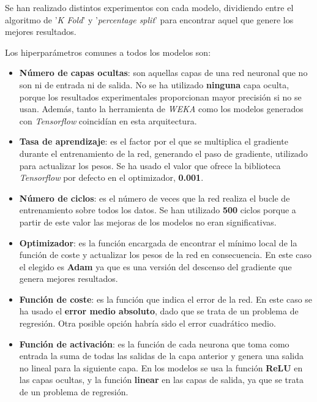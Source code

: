 \documentclass[12pt,a4paper, xcolor=table]{article}
\begin{document}
      \vspace{2mm}

      Se han realizado distintos experimentos con cada modelo, dividiendo entre el algoritmo de '\textit{K Fold}' y '\textit{percentage split}' para encontrar aquel que genere los mejores resultados.

      \vspace{3mm}

      Los hiperparámetros comunes a todos los modelos son:

      \begin{itemize}
        \item \textbf{Número de capas ocultas}: son aquellas capas de una red neuronal que no son ni de entrada ni de salida. No se ha utilizado \textbf{ninguna} capa oculta, porque los resultados experimentales proporcionan mayor precisión si no se usan. Además, tanto la herramienta de \textit{WEKA} como los modelos generados con \textit{Tensorflow} coincidían en esta arquitectura.
        \item \textbf{Tasa de aprendizaje}: es el factor por el que se multiplica el gradiente durante el entrenamiento de la red, generando el paso de gradiente, utilizado para actualizar los pesos. Se ha usado el valor que ofrece la biblioteca \textit{Tensorflow} por defecto en el optimizador, \textbf{0.001}.
        \item \textbf{Número de ciclos}: es el número de veces que la red realiza el bucle de entrenamiento sobre todos los datos. Se han utilizado \textbf{500} ciclos porque a partir de este valor las mejoras de los modelos no eran significativas.
        \item \textbf{Optimizador}: es la función encargada de encontrar el mínimo local de la función de coste y actualizar los pesos de la red en consecuencia. En este caso el elegido es \textbf{Adam} ya que es una versión del descenso del gradiente que genera mejores resultados.
        \item \textbf{Función de coste}: es la función que indica el error de la red. En este caso se ha usado el \textbf{error medio absoluto}, dado que se trata de un problema de regresión. Otra posible opción habría sido el error cuadrático medio.
        \item \textbf{Función de activación}: es la función de cada neurona que toma como entrada la suma de todas las salidas de la capa anterior y genera una salida no lineal para la siguiente capa. En los modelos se usa la función \textbf{ReLU} en las capas ocultas, y la función \textbf{linear} en las capas de salida, ya que se trata de un problema de regresión.

      \end{itemize}
\end{document}
